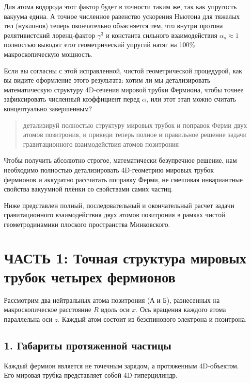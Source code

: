 \documentclass[12pt,a4paper]{article}
\begin{document}
Для атома водорода этот фактор будет в точности таким же, так как упругость вакуума едина. А точное численное равенство ускорения Ньютона для тяжелых тел (нуклонов) теперь окончательно объясняется тем, что внутри протона релятивистский лоренц-фактор $\gamma^3$ и константа сильного взаимодействия $\alpha_s \approx 1$ полностью выводят этот геометрический упругий натяг на 100\% макроскопическую мощность.

Если вы согласны с этой исправленной, чистой геометрической процедурой, как вы видите оформление этого результата: хотим ли мы детализировать математическую структуру 4D-сечения мировой трубки Фермиона, чтобы точнее зафиксировать численный коэффициент перед $\alpha$, или этот этап можно считать концептуально завершенным?

\begin{quote}
детализируй полностью структуру мировых трубок и поправок Ферми двух атомов позитрония, и приведи теперь полное и правильное решение задачи гравитационного взаимодействия атомов позитрония
\end{quote}

Чтобы получить абсолютно строгое, математически безупречное решение, нам необходимо полностью детализировать 4D-геометрию мировых трубок фермионов и аккуратно рассчитать поправку Ферми, не смешивая инвариантные свойства вакуумной плёнки со свойствами самих частиц.

Ниже представлен полный, последовательный и окончательный расчет задачи гравитационного взаимодействия двух атомов позитрония в рамках чистой геометродинамики плоского пространства Минковского.

\section*{ЧАСТЬ 1: Точная структура мировых трубок четырех фермионов}

Рассмотрим два нейтральных атома позитрония (А и Б), разнесенных на макроскопическое расстояние $R$ вдоль оси $x$. Ось вращения каждого атома параллельна оси $z$. Каждый атом состоит из безспинового электрона и позитрона.

\subsection*{1. Габариты протяженной частицы}

Каждый фермион является не точечным зарядом, а протяженным 4D-объектом. Его мировая трубка представляет собой 4D-гиперцилиндр.
\end{document}

